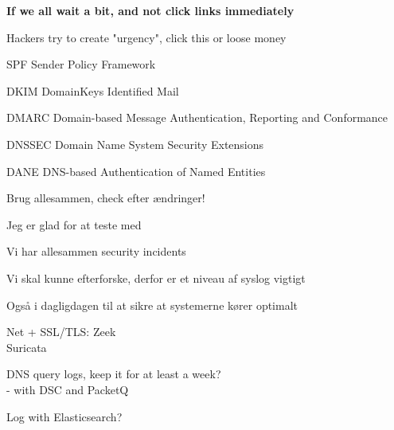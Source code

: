 \documentclass[Screen16to9,17pt]{foils}
\begin{document}
\vskip 1cm
\centerline{\Large\bf If we all wait a bit, and not click links immediately}

\vskip 1cm
Hackers try to create "urgency", click this or loose money




\begin{list2}
\item SPF Sender Policy Framework\\ {\footnotesize{}}
\item DKIM DomainKeys Identified Mail\\
{\footnotesize{}}
\item DMARC Domain-based Message Authentication, Reporting and Conformance\\
{\footnotesize{}}
\item DNSSEC Domain Name System Security Extensions\\ {\footnotesize{}}
\item DANE DNS-based Authentication of Named Entities\\ {\footnotesize{}}
\item Brug allesammen, check efter ændringer!
\end{list2}

\centerline{Jeg er glad for at teste med }



\begin{list2}
\item Vi har allesammen security incidents
\item Vi skal kunne efterforske, derfor er et niveau af syslog vigtigt
\item Også i dagligdagen til at sikre at systemerne kører optimalt
\end{list2}



\begin{list2}
\item Net + SSL/TLS: Zeek  \\Suricata {}
\item DNS query logs, keep it for at least a week?\\
- with DSC and PacketQ 
\item Log with Elasticsearch?\\
{\footnotesize{}}
\end{list2}
\end{document}
